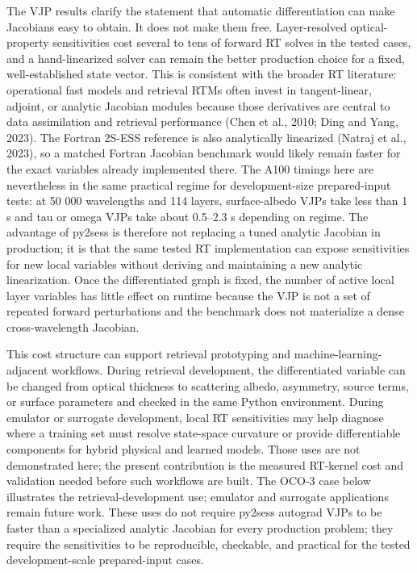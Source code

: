 \documentclass[gmd, manuscript]{copernicus}
\begin{document}
The VJP results clarify the statement that automatic differentiation can make
Jacobians easy to obtain.  It does not make them free.  Layer-resolved optical-property
sensitivities cost several to tens of forward RT solves in the tested cases, and a
hand-linearized solver can remain the better production choice for a fixed,
well-established state vector.  This is consistent with the broader RT literature:
operational fast models and retrieval RTMs often invest in tangent-linear, adjoint, or
analytic Jacobian modules because those derivatives are central to data assimilation
and retrieval performance (Chen et al., 2010; Ding and Yang, 2023).  The Fortran 2S-ESS
reference is also analytically linearized (Natraj et al., 2023), so a matched Fortran
Jacobian benchmark would likely remain faster for the exact variables already
implemented there.  The A100 timings here are nevertheless in the same practical
regime for development-size prepared-input tests: at 50 000 wavelengths and 114 layers,
surface-albedo VJPs take less than 1 s and tau or omega VJPs take about
0.5--2.3 s depending on regime.  The advantage of py2sess is therefore not replacing a
tuned analytic Jacobian in production; it is that the same tested RT implementation can
expose sensitivities for new local variables without deriving and maintaining a new
analytic linearization.  Once the differentiated graph is fixed, the number of active
local layer variables has little effect on runtime because the VJP is not a set of
repeated forward perturbations and the benchmark does not materialize a dense
cross-wavelength Jacobian.

This cost structure can support retrieval prototyping and machine-learning-adjacent
workflows.  During retrieval development, the differentiated variable can be changed
from optical thickness to scattering albedo, asymmetry, source terms, or surface
parameters and checked in the same Python environment.  During emulator or surrogate
development, local RT sensitivities may help diagnose where a training set must resolve
state-space curvature or provide differentiable components for hybrid physical and
learned models.  Those uses are not demonstrated here; the present contribution is the
measured RT-kernel cost and validation needed before such workflows are built.  The
OCO-3 case below illustrates the retrieval-development use; emulator and surrogate
applications remain future work.  These uses do not require py2sess autograd VJPs to
be faster than a specialized analytic Jacobian for every production problem; they
require the sensitivities to be reproducible, checkable, and practical for the tested
development-scale prepared-input cases.
\end{document}
